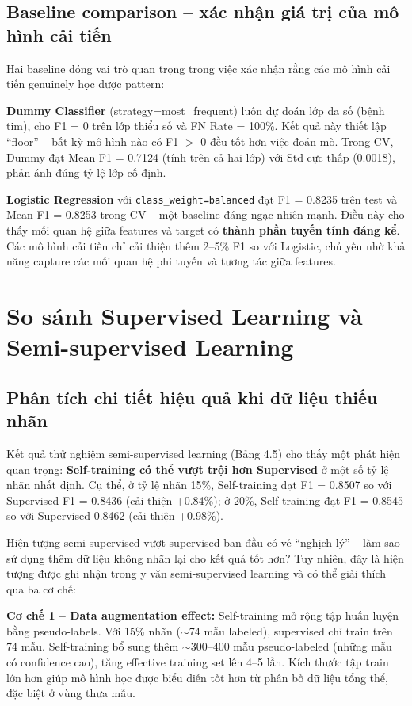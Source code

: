 \subsection{Baseline comparison -- xác nhận giá trị của mô hình cải tiến}

Hai baseline đóng vai trò quan trọng trong việc xác nhận rằng các mô hình cải tiến genuinely học được pattern:

\textbf{Dummy Classifier} (strategy=most\_frequent) luôn dự đoán lớp đa số (bệnh tim), cho F1 = 0 trên lớp thiểu số và FN Rate = 100\%. Kết quả này thiết lập ``floor'' -- bất kỳ mô hình nào có F1 $>$ 0 đều tốt hơn việc đoán mò. Trong CV, Dummy đạt Mean F1 = 0.7124 (tính trên cả hai lớp) với Std cực thấp (0.0018), phản ánh đúng tỷ lệ lớp cố định.

\textbf{Logistic Regression} với \texttt{class\_weight=balanced} đạt F1 = 0.8235 trên test và Mean F1 = 0.8253 trong CV -- một baseline đáng ngạc nhiên mạnh. Điều này cho thấy mối quan hệ giữa features và target có \textbf{thành phần tuyến tính đáng kể}. Các mô hình cải tiến chỉ cải thiện thêm 2--5\% F1 so với Logistic, chủ yếu nhờ khả năng capture các mối quan hệ phi tuyến và tương tác giữa features.

\section{So sánh Supervised Learning và Semi-supervised Learning}

\subsection{Phân tích chi tiết hiệu quả khi dữ liệu thiếu nhãn}

Kết quả thử nghiệm semi-supervised learning (Bảng 4.5) cho thấy một phát hiện quan trọng: \textbf{Self-training có thể vượt trội hơn Supervised} ở một số tỷ lệ nhãn nhất định. Cụ thể, ở tỷ lệ nhãn 15\%, Self-training đạt F1 = 0.8507 so với Supervised F1 = 0.8436 (cải thiện +0.84\%); ở 20\%, Self-training đạt F1 = 0.8545 so với Supervised 0.8462 (cải thiện +0.98\%).

Hiện tượng semi-supervised vượt supervised ban đầu có vẻ ``nghịch lý'' -- làm sao sử dụng thêm dữ liệu không nhãn lại cho kết quả tốt hơn? Tuy nhiên, đây là hiện tượng được ghi nhận trong y văn semi-supervised learning \cite{chapelle2006semi} và có thể giải thích qua ba cơ chế:

\textbf{Cơ chế 1 -- Data augmentation effect:} Self-training mở rộng tập huấn luyện bằng pseudo-labels. Với 15\% nhãn ($\sim$74 mẫu labeled), supervised chỉ train trên 74 mẫu. Self-training bổ sung thêm $\sim$300--400 mẫu pseudo-labeled (những mẫu có confidence cao), tăng effective training set lên 4--5 lần. Kích thước tập train lớn hơn giúp mô hình học được biểu diễn tốt hơn từ phân bố dữ liệu tổng thể, đặc biệt ở vùng thưa mẫu.


